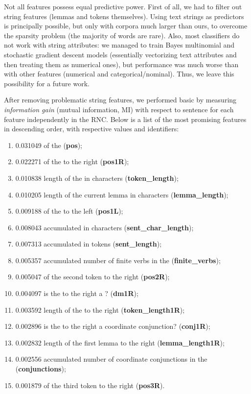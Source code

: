 \documentclass[output=paper]{langsci/langscibook.cls}
\begin{document}
Not all features possess equal predictive power. First of all, we had to filter out string features (lemmas and tokens themselves). Using text strings as predictors is principally possible, but only with corpora much larger than ours, to overcome the sparsity problem (the majority of words are rare). Also, most classifiers do not work with string attributes: we managed to train Bayes multinomial and stochastic gradient descent models (essentially vectorizing text attributes and then treating them as numerical ones), but performance was much worse than with other features (numerical and categorical/nominal). Thus, we leave this possibility for a future work.

After removing problematic string features, we performed basic  by measuring \textit{information gain} (mutual information, MI) with respect to sentence  for each feature independently in the RNC. Below is a list of the most promising features in descending order, with respective  values and identifiers: 
\begin{enumerate}
\item 0.031049  of the  (\textbf{pos});
\item 0.022271  of the  to the right (\textbf{pos1R});
\item 0.010838 length of the  in characters (\textbf{token\_length});
\item 0.010205 length of the current lemma in characters (\textbf{lemma\_length});
\item 0.009188  of the  to the left (\textbf{pos1L});
\item 0.008043 accumulated  in characters (\textbf{sent\_char\_length});
\item 0.007313 accumulated  in tokens (\textbf{sent\_length});
\item 0.005357 accumulated number of finite verbs in the  (\textbf{finite\_verbs});
\item 0.005047  of the second token to the right (\textbf{pos2R});
\item 0.004097 is the  to the right a ? (\textbf{dm1R});
\item 0.003592 length of the  to the right (\textbf{token\_length1R});
\item 0.002896 is the  to the right a coordinate conjunction? (\textbf{conj1R});
\item 0.002832 length of the first lemma to the right (\textbf{lemma\_length1R});
\item 0.002556 accumulated number of coordinate conjunctions in the  (\textbf{conjunctions});
\item 0.001879  of the third token to the right (\textbf{pos3R}).
\end{enumerate}
\end{document}
